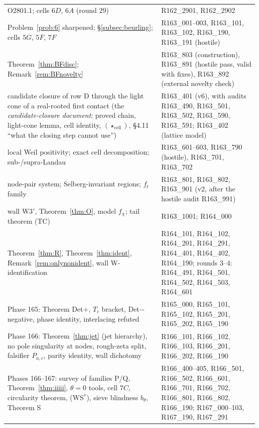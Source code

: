 \documentclass[11pt]{amsart}
\theoremstyle{definition}
\theoremstyle{remark}
\begin{document}
\begin{center}
\begin{tabularx}{\textwidth}{@{}p{5.2cm}Y@{}}
O2801.1; cells $6D$, $6A$ (round 29) & R162\_2901, R162\_2902 \\
Problem~\ref{prob:6} sharpened; \S\ref{subsec:beurling}; cells $5G$, $5F$, $7F$ & R163\_001--003, R163\_101, R163\_102, R163\_190, R163\_191 (hostile) \\
Theorem~\ref{thm:BFdisc}; Remark~\ref{rem:BFnovelty} & R163\_803 (construction), R163\_891 (hostile pass, valid with fixes), R163\_892 (external novelty check) \\
candidate closure of row D through the light cone of a real-rooted first contact (the \emph{candidate-closure document}: proved chain, light-cone lemma, cell identity, $(\star_{\mathrm{cell}})$, \S4.11 ``what the closing step cannot use'') & R163\_401 (v6), with audits R163\_490, R163\_501, R163\_502, R163\_590, R163\_591; R163\_402 (lattice model) \\
local Weil positivity; exact cell decomposition; sub-/supra-Landau & R163\_601--603, R163\_790 (hostile), R163\_701, R163\_702 \\
node-pair system; Selberg-invariant regions; $f_t$ family & R163\_801, R163\_802, R163\_901 (v2, after the hostile audit R163\_991) \\
wall W3$'$, Theorem~\ref{thm:O}, model $f_\chi$; tail theorem (TC) & R163\_1001; R164\_000 \\
Theorem~\ref{thm:R}, Theorem~\ref{thm:ident}, Remark~\ref{rem:onlynonident}, wall W-identification & R164\_101, R164\_102, R164\_201, R164\_291, R164\_401, R164\_402, R164\_190; rounds 3--4: R164\_491, R164\_501, R164\_502, R164\_503, R164\_601 \\
Phase 165: Theorem Det$+$, $T_c$ bracket, Det$-$ negative, phase identity, interlacing refuted & R165\_000, R165\_101, R165\_102, R165\_201, R165\_202, R165\_190 \\
Phase 166: Theorem~\ref{thm:jet} (jet hierarchy), no pole singularity at nodes, rough-zeta split, falsifier $P_{a,c}$, parity identity, wall dichotomy & R166\_101, R166\_102, R166\_103, R166\_201, R166\_202, R166\_190 \\
Phases 166--167: survey of families P/Q, Theorem~\ref{thm:iiiii}, $\theta=0$ tools, cell $7C$, circularity theorem, (WS$^*$), sieve blindness $b_\theta$, Theorem S & R166\_400--405, R166\_501, R166\_502, R166\_601, R166\_701, R166\_702, R166\_801, R166\_802, R166\_190; R167\_000--103, R167\_190, R167\_291 \\
\bottomrule
\end{tabularx}
\end{center}
\end{document}
